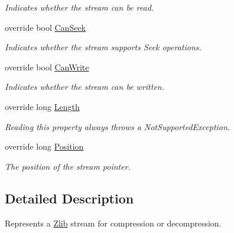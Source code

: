 \begin{DoxyCompactItemize}
\begin{DoxyCompactList}\small\item\em Indicates whether the stream can be read. \end{DoxyCompactList}\item 
override bool \mbox{\hyperlink{class_super_tiled2_unity_1_1_ionic_1_1_zlib_1_1_zlib_stream_ac6add24c362c14e96c10db04ce496b91}{Can\+Seek}}
\begin{DoxyCompactList}\small\item\em Indicates whether the stream supports Seek operations. \end{DoxyCompactList}\item 
override bool \mbox{\hyperlink{class_super_tiled2_unity_1_1_ionic_1_1_zlib_1_1_zlib_stream_aa463427e72afa9aa8063fe0fb1285778}{Can\+Write}}
\begin{DoxyCompactList}\small\item\em Indicates whether the stream can be written. \end{DoxyCompactList}\item 
override long \mbox{\hyperlink{class_super_tiled2_unity_1_1_ionic_1_1_zlib_1_1_zlib_stream_a54ad4fbbd65e5e04fc2b714067f77fba}{Length}}
\begin{DoxyCompactList}\small\item\em Reading this property always throws a Not\+Supported\+Exception. \end{DoxyCompactList}\item 
override long \mbox{\hyperlink{class_super_tiled2_unity_1_1_ionic_1_1_zlib_1_1_zlib_stream_ac1d8a6ad880c57e4b986ba9575eee1f9}{Position}}
\begin{DoxyCompactList}\small\item\em The position of the stream pointer. \end{DoxyCompactList}\end{DoxyCompactItemize}


\subsection{Detailed Description}
Represents a \mbox{\hyperlink{namespace_super_tiled2_unity_1_1_ionic_1_1_zlib}{Zlib}} stream for compression or decompression. 

